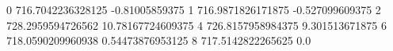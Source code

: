 0 716.7042236328125 -0.81005859375
1 716.9871826171875 -0.527099609375
2 728.2959594726562 10.78167724609375
4 726.8157958984375 9.301513671875
6 718.0590209960938 0.54473876953125
8 717.5142822265625 0.0
